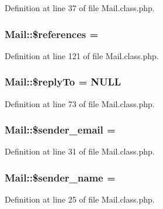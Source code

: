 Definition at line 37 of file Mail.\+class.\+php.

\hypertarget{classMail_abcd438320caac44b166df90ba9092fe9}{}
\subsubsection[{\$references}]{\setlength{\rightskip}{0pt plus 5cm}Mail\+::\$references = \textquotesingle{}\textquotesingle{}}\label{classMail_abcd438320caac44b166df90ba9092fe9}


Definition at line 121 of file Mail.\+class.\+php.

\hypertarget{classMail_a55788852017ccc1716af69cdde26df99}{}
\subsubsection[{\$reply\+To}]{\setlength{\rightskip}{0pt plus 5cm}Mail\+::\$reply\+To = N\+U\+L\+L}\label{classMail_a55788852017ccc1716af69cdde26df99}


Definition at line 73 of file Mail.\+class.\+php.

\hypertarget{classMail_a94dccbbdc161e818d90e41ad197ebe85}{}
\subsubsection[{\$sender\+\_\+email}]{\setlength{\rightskip}{0pt plus 5cm}Mail\+::\$sender\+\_\+email = \textquotesingle{}\textquotesingle{}}\label{classMail_a94dccbbdc161e818d90e41ad197ebe85}


Definition at line 31 of file Mail.\+class.\+php.

\hypertarget{classMail_a0ad6aa18dc8ea8c632bb7a82175e8d68}{}
\subsubsection[{\$sender\+\_\+name}]{\setlength{\rightskip}{0pt plus 5cm}Mail\+::\$sender\+\_\+name = \textquotesingle{}\textquotesingle{}}\label{classMail_a0ad6aa18dc8ea8c632bb7a82175e8d68}


Definition at line 25 of file Mail.\+class.\+php.

